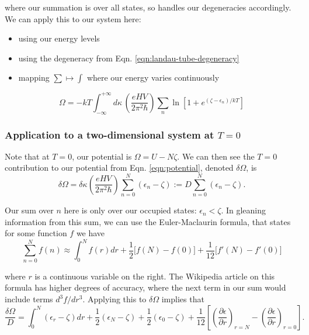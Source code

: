 \documentclass[12pt]{revtex4-2}
\begin{document}
where our summation is over all states, so handles our degeneracies accordingly.  We can apply this to our system here: 
\begin{itemize}
    \item using our energy levels
    \item using the degeneracy from Eqn. \ref{eqn:landau-tube-degeneracy}
    \item mapping $\sum \mapsto \int$ where our energy varies continuously
\end{itemize}

\begin{equation}\label{eqn:potential}
    \boxed{ \Omega = -kT\int_{-\infty}^{+\infty}d\kappa \, \left( \frac{eHV}{2\pi^2\hbar} \right) \sum_n \ln\left[1 + e^{(\zeta-\epsilon_n)/kT}\right] }
\end{equation}

\subsubsection*{Application to a two-dimensional system at $T=0$}
Note that at $T=0$, our potential is $\Omega = U - N\zeta$.  We can then see the $T=0$ contribution to our potential from Eqn. \ref{eqn:potential}, denoted $\delta \Omega$, is 
\begin{equation}
    \delta \Omega = \delta \kappa \left( \frac{eHV}{2\pi^2\hbar} \right)\sum_{n=0}^N (\epsilon_n - \zeta) := D \sum_{n=0}^N (\epsilon_n - \zeta).
\end{equation}

Our sum over $n$ here is only over our occupied states: $\epsilon_n < \zeta$.  In gleaning information from this sum, we can use the Euler-Maclaurin formula, that states for some function $f$ we have
\begin{equation}
    \sum_{n=0}^N f(n) \approx \int_0^N f(r)dr + \frac{1}{2}\big[ f(N) - f(0) \big]  + \frac{1}{12}\big[ f'(N) - f'(0) \big]
\end{equation}

where $r$ is a continuous variable on the right.  The Wikipedia article on this formula has higher degrees of accuracy, where the next term in our sum would include terms $d^3f/dr^3$.  Applying this to $\delta \Omega$ implies that
\begin{equation}
    \frac{\delta \Omega}{D} = \int_0^N (\epsilon_r - \zeta)dr + \frac{1}{2}(\epsilon_N - \zeta) + \frac{1}{2}(\epsilon_0 - \zeta) + \frac{1}{12}\left[ \left( \frac{\partial\epsilon}{\partial r} \right)_{r=N} - \left( \frac{\partial\epsilon}{\partial r} \right)_{r=0} \right].
\end{equation}
\end{document}
